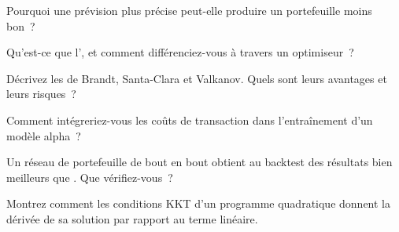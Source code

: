 \begin{interviewq}\label{iq:ml:from-prediction-to-portfolio:1}
Pourquoi une prévision plus précise peut-elle produire un portefeuille moins bon~?
\end{interviewq}

\begin{interviewq}\label{iq:ml:from-prediction-to-portfolio:2}
Qu'est-ce que l', et comment différenciez-vous à travers un optimiseur~?
\end{interviewq}

\begin{interviewq}\label{iq:ml:from-prediction-to-portfolio:3}
Décrivez les  de Brandt, Santa-Clara et Valkanov. Quels sont leurs avantages et leurs risques~?
\end{interviewq}

\begin{interviewq}\label{iq:ml:from-prediction-to-portfolio:4}
Comment intégreriez-vous les coûts de transaction dans l'entraînement d'un modèle alpha~?
\end{interviewq}

\begin{interviewq}\label{iq:ml:from-prediction-to-portfolio:5}
Un réseau de portefeuille de bout en bout obtient au backtest des résultats bien meilleurs que . Que vérifiez-vous~?
\end{interviewq}

\begin{interviewq}\label{iq:ml:from-prediction-to-portfolio:6}
Montrez comment les conditions KKT d'un programme quadratique donnent la dérivée de sa solution par rapport au terme linéaire.
\end{interviewq}
